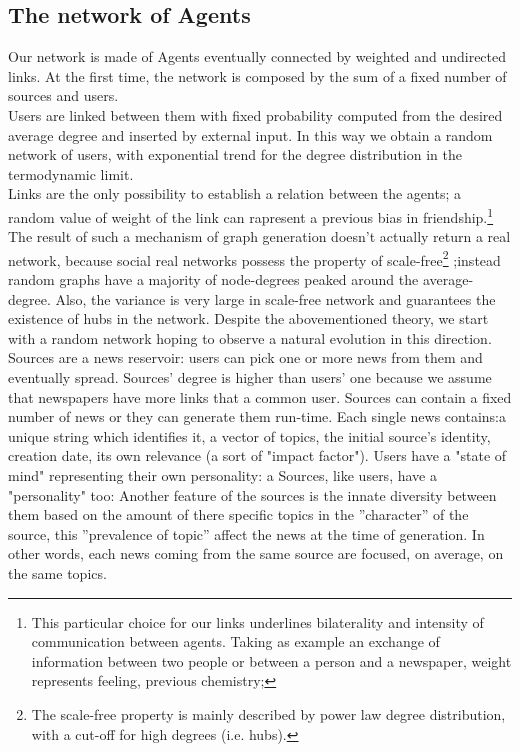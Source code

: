 \documentclass[11pt]{article} %
\begin{document}
\subsection{The network of Agents}
Our network is made of Agents eventually connected by weighted and undirected links.
At the first time, the network is composed by the sum of a fixed number of sources and users. \\
Users are linked between them with fixed probability computed from the desired average degree and inserted by external input.
 In this way we obtain a random network of users, with exponential trend for the degree distribution in the termodynamic limit.
\\ Links are the only possibility to establish a relation between the agents; a random value of weight of the link can rapresent a previous bias in 
friendship.\footnote{This particular choice for our links underlines bilaterality and intensity of communication between agents.
Taking as example an exchange of information between two people or between a person and a newspaper, weight represents feeling, previous chemistry;}
The result of such a mechanism of graph generation doesn't actually return a real network, because social real networks possess the property of 
scale-free\footnote{The scale-free property is mainly described by power law degree distribution, with a cut-off for high degrees (i.e. hubs). }
 ;instead random graphs have a majority of node-degrees peaked around the average-degree. 
Also, the variance is very large in scale-free network and guarantees the existence of hubs in the network.
Despite the abovementioned theory, we start with a random network hoping to observe a natural evolution in this direction.
\\
Sources are a news reservoir: users can pick one or more news from them and eventually spread.
Sources' degree is higher than users' one because we assume that newspapers have more links that a common user.
Sources can contain a fixed number of news or they can generate them run-time.
Each single news contains:a unique string which identifies it, a vector of topics, the initial source's identity, creation date, its own relevance (a sort of "impact factor").
Users have a "state of mind" representing their own personality: a Sources, like users, have a "personality" too:
Another feature of the sources is the innate diversity between them based on the amount of there specific topics in the ''character'' of the source, this ''prevalence of topic'' affect the news at the time of generation. In other words, each news coming from the same source are focused, on average, on the same topics. \\
\end{document}
